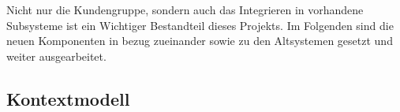 Nicht nur die Kundengruppe, sondern auch das Integrieren in vorhandene Subsysteme ist ein Wichtiger Bestandteil dieses Projekts. Im Folgenden sind die neuen Komponenten in bezug zueinander sowie zu den Altsystemen gesetzt und weiter ausgearbeitet.

\subsection{Kontextmodell}\label{subsec:kontextmodell}
    
